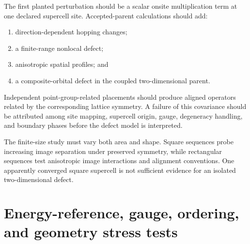 The first planted perturbation should be a scalar onsite multiplication term at
one declared supercell site. Accepted-parent calculations should add:
\begin{enumerate}
    \item direction-dependent hopping changes;
    \item a finite-range nonlocal defect;
    \item anisotropic spatial profiles; and
    \item a composite-orbital defect in the coupled two-dimensional parent.
\end{enumerate}
Independent point-group-related placements should produce aligned operators
related by the corresponding lattice symmetry. A failure of this covariance
should be attributed among site mapping, supercell origin, gauge, degeneracy
handling, and boundary phases before the defect model is interpreted.

The finite-size study must vary both area and shape. Square sequences probe
increasing image separation under preserved symmetry, while rectangular
sequences test anisotropic image interactions and alignment conventions. One
apparently converged square supercell is not sufficient evidence for an
isolated two-dimensional defect.

\section{Energy-reference, gauge, ordering, and geometry stress tests}

